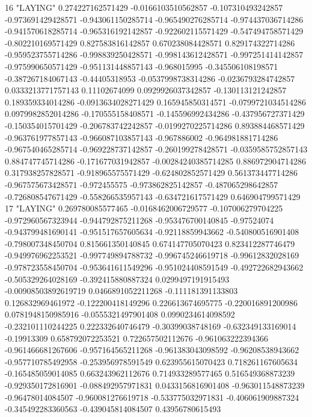 16 "LAYING" 0.274227162571429 -0.0166103510562857 -0.107310493242857 -0.973691429428571 -0.943061150285714 -0.965490276285714 -0.974437036714286 -0.941570618285714 -0.965316192142857 -0.922602115571429 -0.547494758571429 -0.802210169571429 0.827583816142857 0.670238084428571 0.829174322714286 -0.959523755714286 -0.998839250428571 -0.998143612428571 -0.997251414142857 -0.975990650571429 -0.951131448857143 -0.968015995 -0.345506108198571 -0.387267184067143 -0.44405318953 -0.0537998738314286 -0.0236793284742857 0.0333213771757143 0.11102674099 0.0929926037342857 -0.130113121242857 0.189359334014286 -0.0913634028271429 0.165945850314571 -0.0799721034514286 0.0979982852014286 -0.170555158408571 -0.145596992434286 -0.437956727371429 -0.150354015701429 -0.206783742242857 -0.0199270225714286 0.893884468571429 -0.963761977857143 -0.966087103857143 -0.967886002 -0.964981881714286 -0.967540465285714 -0.969228737142857 -0.260199278428571 -0.0359585752857143 0.884747745714286 -0.171677031942857 -0.00284240385714285 0.886972904714286 0.317938257828571 -0.918965575571429 -0.624802852571429 0.561373447714286 -0.967575673428571 -0.972455575 -0.973862825142857 -0.487065298642857 -0.726808547671429 -0.558266535957143 -0.634721617571429 0.646904799571429
17 "LAYING" 0.269780085577465 -0.0168462006729577 -0.107006279704225 -0.972960567323944 -0.944792875211268 -0.953476700140845 -0.97524074 -0.943799481690141 -0.951517657605634 -0.92118859943662 -0.540800516901408 -0.798007348450704 0.815661350140845 0.674147705070423 0.823412287746479 -0.949976962253521 -0.997749894788732 -0.996745246619718 -0.99612832028169 -0.978723558450704 -0.953641611549296 -0.951024408591549 -0.492722682943662 -0.505329264028169 -0.392415880887324 0.0299497191915493 -0.00908503892619719 0.0466891052211268 -0.111181391133803 0.126832969461972 -0.122200418149296 0.226613674695775 -0.220016891200986 0.0781948150985916 -0.0555321497901408 0.0990234614098592 -0.232101110244225 0.222332640746479 -0.30399038748169 -0.632349133169014 -0.19913309 0.658792072253521 0.722657502112676 -0.961063222394366 -0.961466681267606 -0.957164565211268 -0.961383043098592 -0.96208538943662 -0.957710785492958 -0.253956978591549 0.623955615070423 0.718261167605634 -0.165485059014085 0.663243962112676 0.714933289577465 0.516549368873239 -0.929350172816901 -0.088492957971831 0.0433156816901408 -0.963011548873239 -0.96478014084507 -0.960081276619718 -0.533775032971831 -0.406061909887324 -0.345492283360563 -0.439045814084507 0.43956780615493
